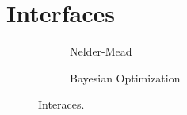 \section{Interfaces}

\begin{figure}
  \centering
  \begin{subfigure}[b]{0.22\textwidth}
    \caption{Nelder-Mead}\label{fig:interface_nm}
  \end{subfigure}
  \quad
  \begin{subfigure}[b]{0.22\textwidth}
    \caption{Bayesian Optimization}\label{fig:interface_bo}
  \end{subfigure}
  \caption{Interaces.}\label{fig:interfaces}
\end{figure}

